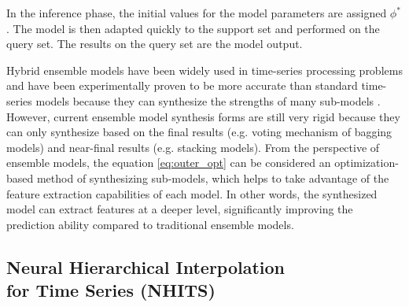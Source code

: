 \documentclass[aps,prb,groupedaddress,twocolumn,showpacs,dvipdfmx,superscriptaddress,pdftex]{revtex4-2}
\begin{document}
\vspace{2mm}


In the inference phase, the initial values for the model parameters are assigned $\phi^*$. The model is then adapted quickly to the support set and performed on the query set. The results on the query set are the model output.

\vspace{2mm}


Hybrid ensemble models have been widely used in time-series processing problems and have been experimentally proven to be more accurate than standard time-series models because they can synthesize the strengths of many sub-models \cite{ayitey2023forex}. However, current ensemble model synthesis forms are still very rigid because they can only synthesize based on the final results (e.g. voting mechanism of bagging models) and near-final results (e.g. stacking models). From the perspective of ensemble models, the equation \ref{eq:outer_opt} can be considered an optimization-based method of synthesizing sub-models, which helps to take advantage of the feature extraction capabilities of each model. In other words, the synthesized model can extract features at a deeper level, significantly improving the prediction ability compared to traditional ensemble models.

\subsection{Neural Hierarchical Interpolation\\for Time Series (NHITS)}
\end{document}
